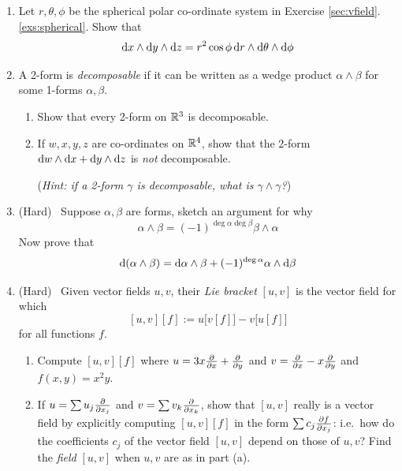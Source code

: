 \begin{exercises}
\begin{enumerate}
	
	\item Let $r,\theta,\phi$ be the spherical polar co-ordinate system in Exercise \ref*{sec:vfield}.\ref{exs:spherical}. Show that 
	\[\dx\wedge\dy\wedge\dz=r^2\cos\phi\,\dr\wedge\dth\wedge\D\phi\]

% 

	\goodbreak

	\item A 2-form is \emph{decomposable} if it can be written as a wedge product $\alpha\wedge\beta$ for some 1-forms $\alpha,\beta$.
	\begin{enumerate}
	  \item Show that every 2-form on $\R^3$ is decomposable.
	  
	  \item If $w,x,y,z$ are co-ordinates on $\R^4$, show that the 2-form $\dw\wedge\dx+\dy\wedge\dz$ is \emph{not} decomposable.\par
	  (\emph{Hint: if a 2-form $\gamma$ is decomposable, what is $\gamma\wedge\gamma$?})
	\end{enumerate}
	

	
	\item (Hard) \ Suppose $\alpha,\beta$ are forms, sketch an argument for why
	\[\alpha\wedge\beta=(-1)^{\deg\alpha\deg\beta}\beta\wedge\alpha\]
	Now prove that
	\[\D(\alpha\wedge\beta)=\D\alpha\wedge\beta+(-1)^{\deg\alpha}\alpha\wedge\D\beta\]
	
	
	\item\label{exs:liebracketdalpha} (Hard) \ Given vector fields $u,v$, their \emph{Lie bracket} $[u,v]$ is the vector field for which
	\[[u,v][f]:=u\bigl[v[f]\bigr] -v\bigl[u[f]\bigr]\]
	for all functions $f$.
	\begin{enumerate}
	  \item Compute $[u,v][f]$ where $u=3x\partials x+\partials y$ and $v=\partials x-x\partials y$ and $f(x,y)=x^2y$.
	  
	  \item If $u=\sum u_j\partials{x_j}$ and $v=\sum v_k\partials{x_k}$, show that $[u,v]$ really is a vector field by explicitly computing $[u,v][f]$ in the form $\sum c_j\partials[f]{x_j}$: i.e.\ how do the coefficients $c_j$ of the vector field $[u,v]$ depend on those of $u,v$? Find the \emph{field} $[u,v]$ when $u,v$ are as in part (a).
	  

\end{enumerate}
\end{enumerate}
\end{exercises}
